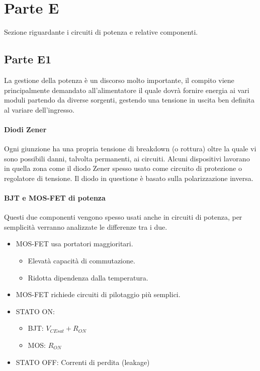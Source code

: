 \documentclass[12pt]{article}
\begin{document}
\section{Parte E}\label{E}
Sezione riguardante i circuiti di potenza e relative componenti.
\subsection{Parte E1}\label{e1} %
La gestione della potenza è un discorso molto importante, il compito viene principalmente demandato all'alimentatore il quale dovrà fornire energia ai vari moduli partendo da diverse sorgenti, gestendo una tensione in uscita ben definita al variare dell'ingresso.

\paragraph{Diodi Zener} Ogni giunzione ha una propria tensione di breakdown (o rottura) oltre la quale vi sono possibili danni, talvolta permanenti, ai circuiti. Alcuni dispositivi lavorano in quella zona come il diodo Zener spesso usato come circuito di protezione o regolatore di tensione. Il diodo in questione è basato sulla polarizzazione inversa.

\paragraph{BJT e MOS-FET di potenza} Questi due componenti vengono spesso usati anche in circuiti di potenza, per semplicità verranno analizzate le differenze tra i due.
\begin{itemize}
  \item MOS-FET usa portatori maggioritari.
  \begin{itemize}
    \item Elevatà capacità di commutazione.
    \item Ridotta dipendenza dalla temperatura.
  \end{itemize}
  \item MOS-FET richiede circuiti di pilotaggio più semplici.
  \item STATO ON:
  \begin{itemize}
    \item BJT: $V_{CEsat} + R_{ON}$
    \item MOS: $R_{ON}$
  \end{itemize}
  \item STATO OFF: Correnti di perdita (leakage)
\end{itemize}
\end{document}
